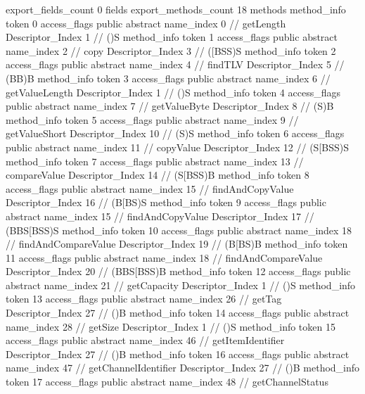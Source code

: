{{{{			}
			export_fields_count	0
			fields {
			}
			export_methods_count	18
			methods {
				method_info {
					token	0
					access_flags	public abstract
					name_index	0		// getLength
					Descriptor_Index	1		// ()S
				}
				method_info {
					token	1
					access_flags	public abstract
					name_index	2		// copy
					Descriptor_Index	3		// ([BSS)S
				}
				method_info {
					token	2
					access_flags	public abstract
					name_index	4		// findTLV
					Descriptor_Index	5		// (BB)B
				}
				method_info {
					token	3
					access_flags	public abstract
					name_index	6		// getValueLength
					Descriptor_Index	1		// ()S
				}
				method_info {
					token	4
					access_flags	public abstract
					name_index	7		// getValueByte
					Descriptor_Index	8		// (S)B
				}
				method_info {
					token	5
					access_flags	public abstract
					name_index	9		// getValueShort
					Descriptor_Index	10		// (S)S
				}
				method_info {
					token	6
					access_flags	public abstract
					name_index	11		// copyValue
					Descriptor_Index	12		// (S[BSS)S
				}
				method_info {
					token	7
					access_flags	public abstract
					name_index	13		// compareValue
					Descriptor_Index	14		// (S[BSS)B
				}
				method_info {
					token	8
					access_flags	public abstract
					name_index	15		// findAndCopyValue
					Descriptor_Index	16		// (B[BS)S
				}
				method_info {
					token	9
					access_flags	public abstract
					name_index	15		// findAndCopyValue
					Descriptor_Index	17		// (BBS[BSS)S
				}
				method_info {
					token	10
					access_flags	public abstract
					name_index	18		// findAndCompareValue
					Descriptor_Index	19		// (B[BS)B
				}
				method_info {
					token	11
					access_flags	public abstract
					name_index	18		// findAndCompareValue
					Descriptor_Index	20		// (BBS[BSS)B
				}
				method_info {
					token	12
					access_flags	public abstract
					name_index	21		// getCapacity
					Descriptor_Index	1		// ()S
				}
				method_info {
					token	13
					access_flags	public abstract
					name_index	26		// getTag
					Descriptor_Index	27		// ()B
				}
				method_info {
					token	14
					access_flags	public abstract
					name_index	28		// getSize
					Descriptor_Index	1		// ()S
				}
				method_info {
					token	15
					access_flags	public abstract
					name_index	46		// getItemIdentifier
					Descriptor_Index	27		// ()B
				}
				method_info {
					token	16
					access_flags	public abstract
					name_index	47		// getChannelIdentifier
					Descriptor_Index	27		// ()B
				}
				method_info {
					token	17
					access_flags	public abstract
					name_index	48		// getChannelStatus
}}}}}
